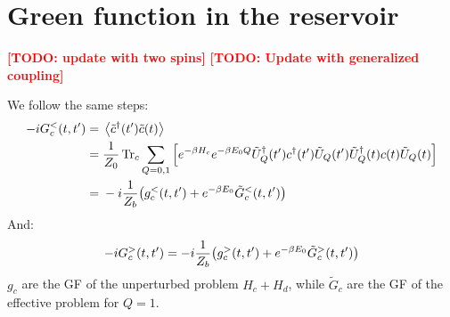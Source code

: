 \documentclass[12pt]{article}
\newcommand\TODO[1]{\textcolor{red}{\textbf{[TODO: #1]}}}
\begin{document}
\section{Green function in the reservoir}

\TODO{update with two spins}
\TODO{Update with generalized coupling}

We follow the same steps:
\begin{align}
	-i G^<_c(t, t') ={}& \expval{\tilde c^\dagger(t') \tilde c(t)}
	\\
	={}& \frac{1}{Z_0} \Tr_c \sum_{Q=0,1} \qty[e^{-\beta H_c} e^{-\beta E_0 Q} \tilde U_Q^\dagger(t') c^\dagger(t') \tilde U_Q(t') \tilde U_Q^\dagger(t) c(t) \tilde U_Q(t)]
	\\
	={}& -i \frac{1}{Z_b} \qty(g^<_c(t, t') + e^{-\beta E_0} \tilde G^<_c(t, t'))
\end{align}
And:
\begin{equation}
	-i G^>_c(t, t') = -i \frac{1}{Z_b} \qty(g^>_c(t, t') + e^{-\beta E_0} \tilde G^>_c(t, t'))
\end{equation}
$g_c$ are the \ac{GF} of the unperturbed problem $H_c + H_d$, while $\tilde G_c$ are the \ac{GF} of the effective problem for $Q=1$.




\end{document}
